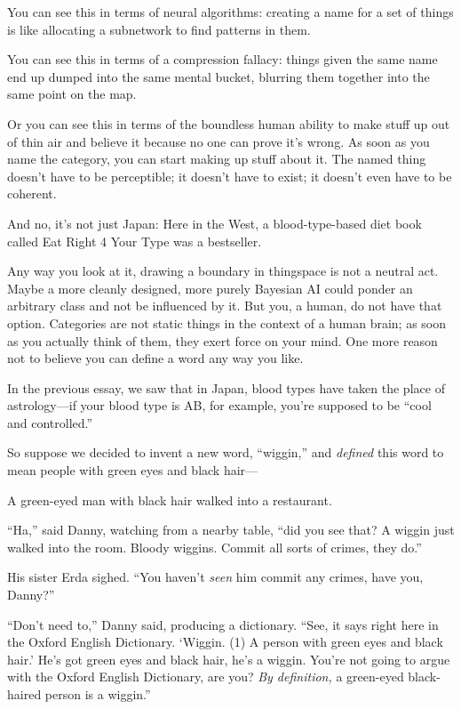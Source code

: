 {
 You can see this in terms of neural algorithms: creating a name
for a set of things is like allocating a subnetwork to find patterns in
them.}

{
 You can see this in terms of a compression fallacy: things given
the same name end up dumped into the same mental bucket, blurring them
together into the same point on the map.}

{
 Or you can see this in terms of the boundless human ability to
make stuff up out of thin air and believe it because no one can prove
it's wrong. As soon as you name the category, you can
start making up stuff about it. The named thing doesn't
have to be perceptible; it doesn't have to exist; it
doesn't even have to be coherent.}

{
 And no, it's not just Japan: Here in the West, a
blood-type-based diet book called Eat Right 4 Your Type was a
bestseller.}

{
 Any way you look at it, drawing a boundary in thingspace is not a
neutral act. Maybe a more cleanly designed, more purely Bayesian AI
could ponder an arbitrary class and not be influenced by it. But you, a
human, do not have that option. Categories are not static things in the
context of a human brain; as soon as you actually think of them, they
exert force on your mind. One more reason not to believe you can define
a word any way you like.}

\myendsectiontext


{
 In the previous essay, we saw that in Japan, blood types have
taken the place of astrology---if your blood type is AB, for example,
you're supposed to be ``cool and
controlled.'' }

{
 So suppose we decided to invent a new word,
``wiggin,'' and \textit{defined}
this word to mean people with green eyes and black hair---}

{
 A green-eyed man with black hair walked into a restaurant.}

{
 ``Ha,'' said Danny, watching
from a nearby table, ``did you see that? A wiggin just
walked into the room. Bloody wiggins. Commit all sorts of crimes, they
do.''}

{
 His sister Erda sighed. ``You
haven't \textit{seen} him commit any crimes, have you,
Danny?''}

{
 ``Don't need
to,'' Danny said, producing a dictionary.
``See, it says right here in the Oxford English
Dictionary. `Wiggin. (1) A person with green eyes and
black hair.' He's got green eyes and
black hair, he's a wiggin. You're not
going to argue with the Oxford English Dictionary, are you? \textit{By
definition,} a green-eyed black-haired person is a
wiggin.''}

